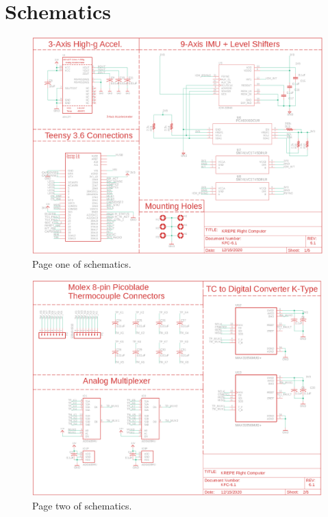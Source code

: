 \documentclass{article}
\begin{document}
\appendix


\section{Schematics}
\label{appa}

\begin{figure}[H]
    \centering
    \includegraphics[width=\textwidth]{images/page1.png}
    \caption{Page one of schematics.}
    \label{fig:page1-2}
\end{figure}

\begin{figure}[H]
    \centering
    \includegraphics[width=\textwidth]{images/page2.png}
    \caption{Page two of schematics.}
    \label{fig:page1_1}
\end{figure}
\end{document}
